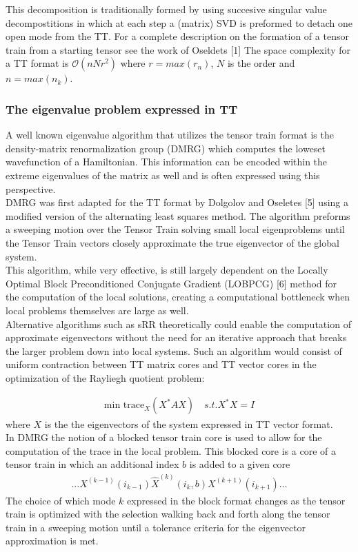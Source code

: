 \documentclass[%
 aip,12pt
 amsmath,amssymb,
 reprint,%
]{revtex4-1}
\begin{document}
This decomposition is traditionally formed by using succesive singular value decompostitions in which at each step a (matrix) SVD is preformed to detach one open mode from the TT. For a complete description on the formation of a tensor train from a starting tensor see the work of Oseldets [1]
The space complexity for a TT format is $\mathcal{O}(nNr^2)$ where $r=max(r_n)$, $N$ is the order and  $n=max(n_k)$.\\
\subsubsection{\label{sec:level3} The eigenvalue problem expressed in TT }

A well known eigenvalue algorithm that utilizes the tensor train format is the  density-matrix renormalization group (DMRG) which computes the loweset wavefunction of a Hamiltonian. This information can be encoded within the extreme eigenvalues of the matrix as well and is often expressed using this perspective. \\
DMRG was first adapted for the TT format by Dolgolov and Oseletes [5] using a modified version of the alternating least squares method. The algorithm preforms a sweeping motion over the Tensor Train solving small local eigenproblems until the Tensor Train vectors closely approximate the true eigenvector of the global system.
\\
This algorithm, while very effective,  is still largely dependent on the Locally Optimal Block Preconditioned Conjugate Gradient (LOBPCG) [6] method for the computation of the local solutions, creating a computational bottleneck when local problems themselves are large as well.\\
Alternative algorithms such as sRR theoretically could enable the computation of approximate eigenvectors without the need for an iterative approach that breaks the larger problem down into local systems. Such an algorithm would consist of uniform contraction between TT matrix cores and TT vector cores in the optimization of the Rayliegh quotient problem:

\begin{eqnarray}
  \text{min trace}_X(X^*AX)\quad s.t. X^*X=I
  \label{eq:five}
\end{eqnarray}
 where $X$ is the the eigenvectors of the system expressed in TT vector format. \\
 In DMRG  the notion of a blocked tensor train core is used to allow for the computation of the trace in the local problem. This blocked core is a core of a tensor train in which an additional index $b$ is added to a given core
 \begin{eqnarray}
 \dots X^{(k-1)}\left(i_{k-1}\right) \widehat{X}^{(k)}\left(i_{k}, b\right) X^{(k+1)}\left(i_{k+1}\right) \ldots
\end{eqnarray}
The choice of which mode $k$ expressed in the block format changes as the tensor train is optimized with the selection walking back and forth along the tensor train in a sweeping motion until a tolerance criteria for the eigenvector approximation is met.
\end{document}
